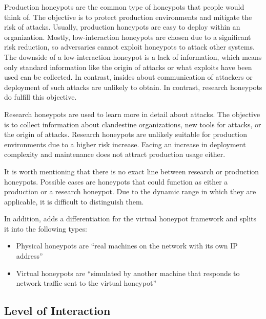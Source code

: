 Production honeypots are the common type of honeypots that people would think of.
The objective is to protect production environments and mitigate the risk of attacks.
Usually, production honeypots are easy to deploy within an organization.
Mostly, low-interaction honeypots are chosen due to a significant risk reduction, so adversaries cannot exploit honeypots to attack other systems.
The downside of a low-interaction honeypot is a lack of information, which means only standard information like the origin of attacks or what exploits have been used can be collected. In contrast, insides about communication of attackers or deployment of such attacks are unlikely to obtain.
In contrast, research honeypots do fulfill this objective. \cite{Spitzner2003}

Research honeypots are used to learn more in detail about attacks.
The objective is to collect information about clandestine organizations, new tools for attacks, or the origin of attacks.
Research honeypots are unlikely suitable for production environments due to a higher risk increase.
Facing an increase in deployment complexity and maintenance does not attract production usage either. \cite{Spitzner2003}

It is worth mentioning that there is no exact line between research or production honeypots.
Possible cases are honeypots that could function as either a production or a research honeypot.
Due to the dynamic range in which they are applicable, it is difficult to distinguish them.

In addition, \citet{Provos2003} adds a differentiation for the virtual honeypot framework and splits it into the following types:

\begin{itemize}
    \item Physical honeypots are \enquote{real machines on the network with its own IP address} \cite{Provos2003}
    \item Virtual honeypots are \enquote{simulated by another machine that responds to network traffic sent to the virtual honeypot} \cite{Provos2003}
\end{itemize}

\subsection{Level of Interaction}
\label{subsec:interaction-honeypots}

